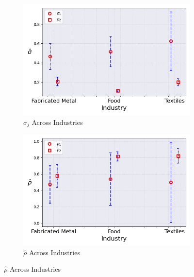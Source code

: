 \documentclass{article}
\begin{document}
\begin{figure}[ht!]
    \begin{subfigure}[t]{0.32\textwidth}
        \centering
        \includegraphics[width=\textwidth]{figure/ar1_normal_sigma_across_industries_m2.png}
        \caption{$\hat\sigma_j$ Across Industries}
    \end{subfigure}
    \begin{subfigure}[t]{0.32\textwidth}
        \centering
        \includegraphics[width=\textwidth]{figure/ar1_normal_rho_across_industries_m2.png}
        \caption{$\hat\rho$ Across Industries}
    \end{subfigure}
\end{figure}
\end{document}
